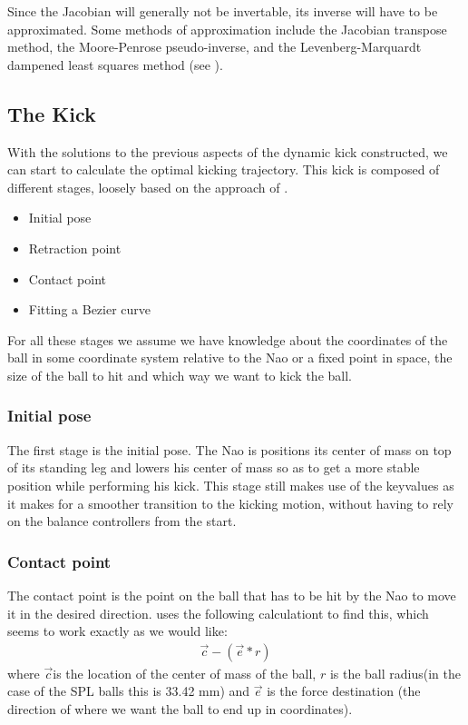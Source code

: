 \documentclass[a4paper]{article}
\begin{document}
Since the Jacobian will generally not be invertable, its inverse will
have to be approximated. Some methods of approximation include the
Jacobian transpose method, the Moore-Penrose pseudo-inverse, and the
Levenberg-Marquardt dampened least squares method (see \cite{Buss2009}).

\subsection{The Kick}
With the solutions to the previous aspects of the dynamic kick constructed, 
we can start to calculate the optimal kicking trajectory. This kick is composed
of different stages, loosely based on the approach of \cite{Xu2010}. 
\begin{itemize}
    \item Initial pose
    \item Retraction point
    \item Contact point
    \item Fitting a Bezier curve
\end{itemize}

For all these stages we assume we have knowledge about the coordinates of the
ball in some coordinate system relative to the Nao or a fixed point in space,
the size of the ball to hit and which way we want to kick the ball.

\subsubsection{Initial pose}
The first stage is the initial pose. The Nao is positions its center of mass on
top of its standing leg and lowers his center of mass so as to get a more stable
position while performing his kick. This stage still makes use of the  keyvalues as 
it makes for a smoother transition to the kicking motion, without having to rely on 
the balance controllers from the start. 

\subsubsection{Contact point}
The contact point is the point on the ball that has to be hit by the Nao to
move it in the desired direction. \cite{Xu2010} uses the following
calculationt to find this, which seems to work exactly as we would like:
\begin{align*}
    \vec{c} - ( \vec{e} * r )
\end{align*}
where $\vec{c}$is the location of the center of mass of the ball, $r$ is the
ball radius(in the case of the SPL balls this is 33.42 mm) and $\vec{e}$ is the
force destination (the direction of where we want the ball to end up in
coordinates).
\end{document}
